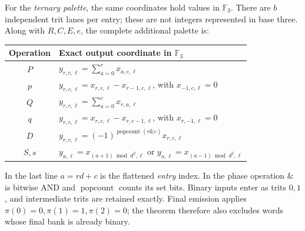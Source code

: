 For the \emph{ternary palette}, the same coordinates hold values in
$\mathbb F_3$.  There are $b$ independent trit lanes per entry; these are not
integers represented in base three.  Along with $R,C,E,e$, the complete
additional palette is:
\begin{center}
\begin{tabular}{c l}
\hline
Operation & Exact output coordinate in $\mathbb F_3$ \\
\hline
$P$ & $y_{r,c,\ell}=\sum_{a=0}^{r}x_{a,c,\ell}$ \\
$p$ & $y_{r,c,\ell}=x_{r,c,\ell}-x_{r-1,c,\ell}$, with $x_{-1,c,\ell}=0$ \\
$Q$ & $y_{r,c,\ell}=\sum_{a=0}^{c}x_{r,a,\ell}$ \\
$q$ & $y_{r,c,\ell}=x_{r,c,\ell}-x_{r,c-1,\ell}$, with $x_{r,-1,\ell}=0$ \\
$D$ & $y_{r,c,\ell}=(-1)^{\operatorname{popcount}(r\mathbin{\&}c)}x_{r,c,\ell}$ \\
$S,s$ & $y_{a,\ell}=x_{(a+1)\bmod d^2,\ell}$ or
 $y_{a,\ell}=x_{(a-1)\bmod d^2,\ell}$ \\
\hline
\end{tabular}
\end{center}
In the last line $a=rd+c$ is the flattened \emph{entry} index.  In the phase
operation $\&$ is bitwise AND and $\operatorname{popcount}$ counts its set bits.
Binary inputs enter as trits $0,1$, and intermediate trits are retained
exactly.  Final emission applies $\pi(0)=0,\pi(1)=1,\pi(2)=0$; the theorem
therefore also excludes words whose final bank is already binary.

